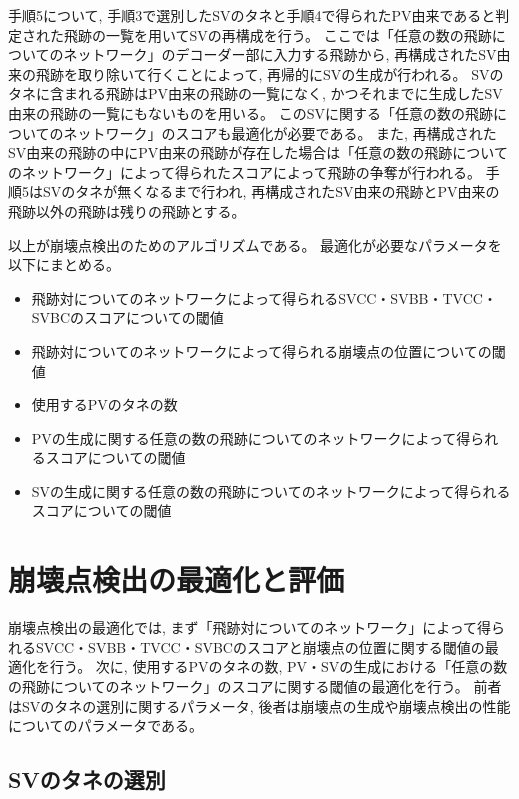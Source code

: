 手順5について, 手順3で選別したSVのタネと手順4で得られたPV由来であると判定された飛跡の一覧を用いてSVの再構成を行う。
ここでは「任意の数の飛跡についてのネットワーク」のデコーダー部に入力する飛跡から, 再構成されたSV由来の飛跡を取り除いて行くことによって, 再帰的にSVの生成が行われる。
SVのタネに含まれる飛跡はPV由来の飛跡の一覧になく, かつそれまでに生成したSV由来の飛跡の一覧にもないものを用いる。
このSVに関する「任意の数の飛跡についてのネットワーク」のスコアも最適化が必要である。
また, 再構成されたSV由来の飛跡の中にPV由来の飛跡が存在した場合は「任意の数の飛跡についてのネットワーク」によって得られたスコアによって飛跡の争奪が行われる。
手順5はSVのタネが無くなるまで行われ, 再構成されたSV由来の飛跡とPV由来の飛跡以外の飛跡は残りの飛跡とする。

以上が崩壊点検出のためのアルゴリズムである。
最適化が必要なパラメータを以下にまとめる。

\begin{itemize}
 \item 飛跡対についてのネットワークによって得られるSVCC・SVBB・TVCC・SVBCのスコアについての閾値
 \item 飛跡対についてのネットワークによって得られる崩壊点の位置についての閾値
 \item 使用するPVのタネの数
 \item PVの生成に関する任意の数の飛跡についてのネットワークによって得られるスコアについての閾値
 \item SVの生成に関する任意の数の飛跡についてのネットワークによって得られるスコアについての閾値
\end{itemize}


\section{崩壊点検出の最適化と評価} \label{VFDL:TuneandPerformanceofVFDL}

崩壊点検出の最適化では, まず「飛跡対についてのネットワーク」によって得られるSVCC・SVBB・TVCC・SVBCのスコアと崩壊点の位置に関する閾値の最適化を行う。
次に, 使用するPVのタネの数, PV・SVの生成における「任意の数の飛跡についてのネットワーク」のスコアに関する閾値の最適化を行う。
前者はSVのタネの選別に関するパラメータ, 後者は崩壊点の生成や崩壊点検出の性能についてのパラメータである。


\subsection{SVのタネの選別} \label{VFDL:TPVFDL:SVSeedSelection}

